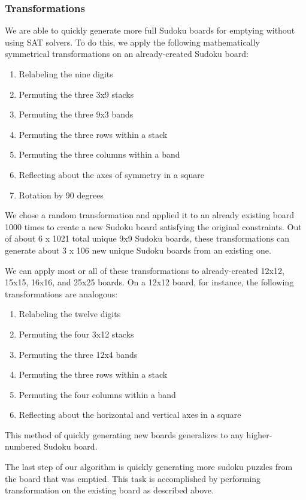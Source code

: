 \subsubsection{Transformations}
We are able to quickly generate more full Sudoku boards for emptying
without using SAT solvers. To do this, we apply the following
mathematically symmetrical transformations on an already-created
Sudoku board:

\singlespace
\begin{enumerate}
\item Relabeling the nine digits
\item Permuting the three 3x9 stacks
\item Permuting the three 9x3 bands
\item Permuting the three rows within a stack
\item Permuting the three columns within a band
\item Reflecting about the axes of symmetry in a square
\item Rotation by 90 degrees
\end{enumerate}
\doublespace
 
We chose a random transformation and applied it to an already existing
board 1000 times to create a new Sudoku board satisfying the original
constraints. Out of about 6 x 1021 total unique 9x9 Sudoku boards,
these transformations can generate about 3 x 106 new unique Sudoku
boards from an existing one.

We can apply most or all of these transformations to already-created
12x12, 15x15, 16x16, and 25x25 boards. On a 12x12 board, for instance,
the following transformations are analogous:

\singlespace
\begin{enumerate}
\item Relabeling the twelve digits
\item Permuting the four 3x12 stacks
\item Permuting the three 12x4 bands
\item Permuting the three rows within a stack
\item Permuting the four columns within a band
\item Reflecting about the horizontal and vertical axes in a square
\end{enumerate}
\doublespace
 
This method of quickly generating new boards generalizes to any
higher-numbered Sudoku board. 


The last step of our algorithm is quickly generating more sudoku
puzzles from the board that was emptied. This task is accomplished by
performing transformation on the existing board as described above.


